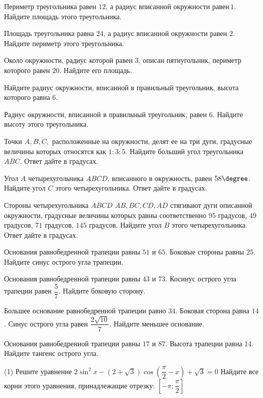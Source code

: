 \begin{consultation}
	\begin{listofex}
		\item Периметр треугольника равен \(12\), а радиус вписанной окружности равен \(1\). Найдите площадь этого треугольника.
		\item Площадь треугольника равна \(24\), а радиус вписанной окружности равен \(2\). Найдите периметр этого треугольника.
		\item Около окружности, радиус которой равен \(3\), описан пятиугольник, периметр которого равен \(20\). Найдите его площадь.
		\item Найдите радиус окружности, вписанной в правильный треугольник, высота которого равна \(6\).
		\item Радиус окружности, вписанной в правильный треугольник, равен \(6\). Найдите высоту этого треугольника.
		\item Точки \(A, B, C,\) расположенные на окружности, делят ее на три дуги, градусные величины которых относятся как \(1 : 3 : 5\). Найдите больший угол треугольника \(ABC\). Ответ дайте в градусах.
		\item Угол \(A\) четырехугольника \(ABCD\), вписанного в окружность, равен \(58\degree\). Найдите угол \(C\) этого четырехугольника. Ответ дайте в градусах.
		\item Стороны четырехугольника \(ABCD \) \( AB, BC, CD, AD\) стягивают дуги описанной окружности, градусные величины которых равны соответственно \(95\) градусов, \(49\) градусов, \(71\) градусов, \(145\) градусов. Найдите угол \(B\) этого четырехугольника. Ответ дайте в градусах.
		\item Основания равнобедренной трапеции равны \(51\) и \(65\). Боковые стороны равны \(25\). Найдите синус острого угла трапеции.
		\item Основания равнобедренной трапеции равны \(43\) и \(73\). Косинус острого угла трапеции равен \( \dfrac{5}{7} \).  Найдите боковую сторону.
		\item Большее основание равнобедренной трапеции равно \(34\). Боковая сторона равна \(14\). Синус острого угла равен \( \dfrac{2\sqrt{10}}{7} \). Найдите меньшее основание.
		\item Основания равнобедренной трапеции равны \(17\) и \(87\). Высота трапеции равна \(14\). Найдите тангенс острого угла.
		\item %
		\begin{tasks}(1)
			\task Решите уравнение \( 2\sin^2 x - (2+\sqrt{3})\cos \left( \dfrac{\pi}{2} - x \right) + \sqrt{3} = 0 \)
			\task Найдите все корни этого уравнения, принадлежащие отрезку: \( \left[ -\pi; \dfrac{\pi}{2} \right] \)
		\end{tasks}
	\end{listofex}
\end{consultation}
